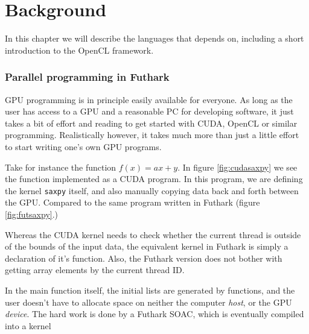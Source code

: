 \chapter{Background}
In this chapter we will describe the languages that \fshark{} depends on,
including a short introduction to the OpenCL framework.

\subsection*{Parallel programming in Futhark}
GPU programming is in principle easily available for everyone. As long as the user has access
to a GPU and a reasonable PC for developing software, it just takes a bit of
effort and reading to get started with CUDA, OpenCL or similar programming.
Realistically however, it takes much more than just a little effort to start writing
one's own GPU programs.

Take for instance the function $f(x) = ax+y$. In figure \ref{fig:cudasaxpy} we see the
function implemented as a CUDA program. In this program, we are defining the
kernel \texttt{saxpy} itself, and also manually copying data back and forth
between the GPU.
Compared to the same program written in Futhark (figure \ref{fig:futsaxpy}.)

Whereas the CUDA kernel needs to check whether the current thread is outside of
the bounds of the input data, the equivalent kernel in Futhark is simply a
declaration of it's function. Also, the Futhark version does not bother with
getting array elements by the current thread ID.

In the main function itself, the initial lists are generated by functions, and
the user doesn't have to allocate space on neither the computer \textit{host},
or the GPU \textit{device}.
The hard work is done by a Futhark SOAC, which is eventually compiled into a
kernel  %

